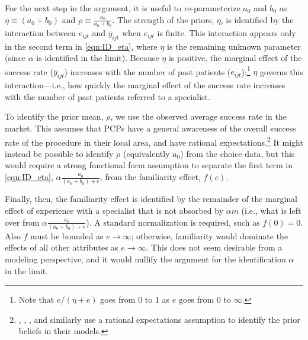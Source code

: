 \documentclass[12pt]{article}
\begin{document}
For the next step in the argument, it is useful to re-parameterize $a_0$ and $b_0$ as $\eta \equiv (a_0 + b_0)$ and $\rho \equiv \frac{a_0}{a_0 + b_0}$. The strength of the priors, $\eta$, is identified by the interaction between $e_{ijt}$ and $\bar y_{ijt}$ when $e_{ijt}$ is finite. This interaction appears only in the second term in \eqref{eqn:ID_eta}, where $\eta$ is the remaining unknown parameter (since $\alpha$ is identified in the limit). Because $\eta$ is positive, the marginal effect of the success rate ($\bar y_{ijt}$) increases with the number of past patients ($e_{ijt}$);\footnote{Note that $e / (\eta + e)$ goes from 0 to 1 as $e$ goes from 0 to $\infty$.} $\eta$ governs this interaction---i.e., how quickly the marginal effect of the success rate increases with the number of past patients referred to a specialist.

To identify the prior mean, $\rho$, we use the observed average success rate in the market.  This assumes that PCPs have a general awareness of the overall success rate of the procedure in their local area, and have rational expectations.\footnote{\cite{coscelli2004}, \cite{crawford2005}, \cite{chan2013}, and \cite{dickstein2018} similarly use a rational expectations assumption to identify the prior beliefs in their models.}  It might instead be possible to identify $\rho$ (equivalently $a_0$) from the choice data, but this would require a strong functional form assumption to separate the first term in \eqref{eqn:ID_eta}, $\alpha \frac{ a_0 }{ (a_0 + b_0) + e}$, from the familiarity effect, $f(e)$.

Finally, then, the familiarity effect is identified by the remainder of the marginal effect of experience with a specialist that is not absorbed by $\alpha m$ (i.e., what is left over from $\alpha \frac{ a_0 }{ (a_0 + b_0) + e}$).
A standard normalization is required, such as $f(0) = 0$. Also $f$ must be bounded as $e \rightarrow \infty$; otherwise, familiarity would dominate the effects of all other attributes as $e \rightarrow \infty$. This does not seem desirable from a modeling perspective, and it would nullify the argument for the identification $\alpha$ in the limit.
\end{document}
